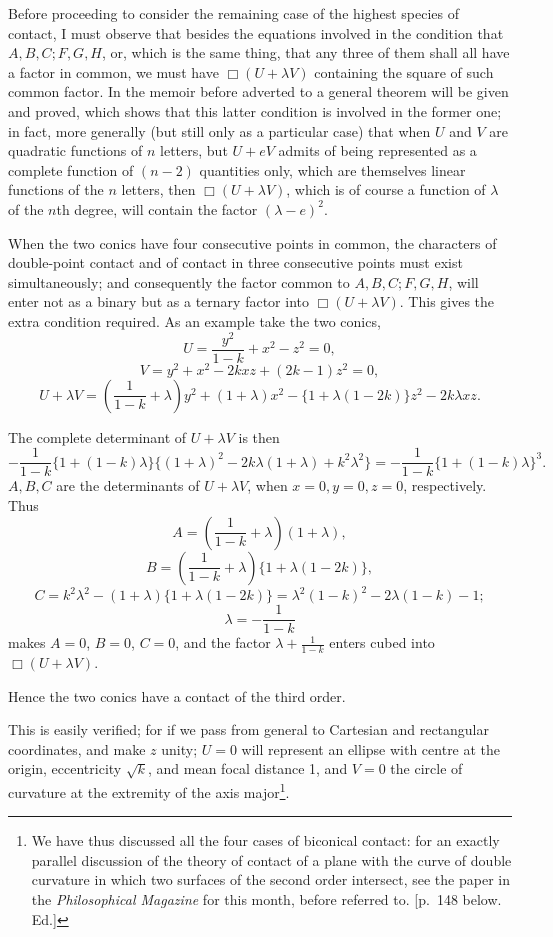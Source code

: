 \documentclass[11pt]{article}
\newcommand{\sourcepage}[1]{\marginpar{\scriptsize p.~#1}}
\begin{document}
{{Before proceeding to consider the remaining case of the highest species of contact, I must observe that besides the equations involved in the condition that $A,B,C;F,G,H$, or, which is the same thing, that any three of them shall all have a factor in common, we must have $\Box(U+\lambda V)$ containing the square of such common factor. In the memoir before adverted to a general theorem will be given and proved, which shows that this latter condition is involved in the former one; in fact, more generally (but still only as a particular case) that when $U$ and $V$ are quadratic functions of $n$ letters, but $U+eV$ admits of being represented as a complete function of $(n-2)$ quantities only, which are themselves linear functions of the $n$ letters, then $\Box(U+\lambda V)$, which is of course a function of $\lambda$ of the $n$th degree, will contain the factor $(\lambda-e)^2$.

When the two conics have four consecutive points in common, the characters of double-point contact and of contact in three consecutive points must exist simultaneously; and consequently the factor common to $A,B,C;F,G,H$, will enter not as a binary but as a ternary factor into $\Box(U+\lambda V)$. This gives the extra condition required. As an example take the two conics,
\[
U=\frac{y^2}{1-k}+x^2-z^2=0,
\]
\[
V=y^2+x^2-2kxz+(2k-1)z^2=0,
\]
\[
U+\lambda V=\left(\frac{1}{1-k}+\lambda\right)y^2+(1+\lambda)x^2-\{1+\lambda(1-2k)\}z^2-2k\lambda xz.
\]

\sourcepage{135}
The complete determinant of $U+\lambda V$ is then
\[
-\frac{1}{1-k}\{1+(1-k)\lambda\}\{(1+\lambda)^2-2k\lambda(1+\lambda)+k^2\lambda^2\}
=-\frac{1}{1-k}\{1+(1-k)\lambda\}^3.
\]
$A,B,C$ are the determinants of $U+\lambda V$, when $x=0,y=0,z=0$, respectively. Thus
\[
A=\left(\frac{1}{1-k}+\lambda\right)(1+\lambda),
\]
\[
B=\left(\frac{1}{1-k}+\lambda\right)\{1+\lambda(1-2k)\},
\]
\[
C=k^2\lambda^2-(1+\lambda)\{1+\lambda(1-2k)\}
=\lambda^2(1-k)^2-2\lambda(1-k)-1;
\]
\[
\lambda=-\frac{1}{1-k}
\]
makes $A=0$, $B=0$, $C=0$, and the factor $\lambda+\frac{1}{1-k}$ enters cubed into $\Box(U+\lambda V)$.

Hence the two conics have a contact of the third order.

This is easily verified; for if we pass from general to Cartesian and rectangular coordinates, and make $z$ unity; $U=0$ will represent an ellipse with centre at the origin, eccentricity $\sqrt{k}$, and mean focal distance 1, and $V=0$ the circle of curvature at the extremity of the axis major\footnote{We have thus discussed all the four cases of biconical contact: for an exactly parallel discussion of the theory of contact of a plane with the curve of double curvature in which two surfaces of the second order intersect, see the paper in the \emph{Philosophical Magazine} for this month, before referred to. [p.~148 below. Ed.]}.

}}
\end{document}
